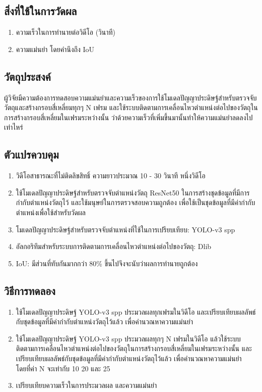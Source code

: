 \subsection*{สิ่งที่ใช้ในการวัดผล}
	\begin{enumerate}
		\setlength\itemsep{-0.25em}
		\item ความเร็วในการทำนายต่อวิดีโอ (วินาที)
		\item ความแม่นยำ โดยคำนึงถึง IoU
	\end{enumerate}
\subsection*{วัตถุประสงค์}
ผู้วิจัยมีความต้องการทดสอบความแม่นยำและความเร็วของการใช้โมเดลปัญญาประดิษฐ์สำหรับตรวจจับวัตถุและสร้างกรอบสี่เหลี่ยมทุกๆ N เฟรม 
และใช้ระบบติดตามการเคลื่อนไหวตำแหน่งต่อไปของวัตถุในการสร้างกรอบสี่เหลี่ยมในเฟรมระหว่างนั้น ว่าด้วยความเร็วที่เพิ่มขึ้นมานั้นทำให้ความแม่นยำลดลงไปเท่าไหร่
\subsection*{ตัวแปรควบคุม}
	\begin{enumerate}
		\setlength\itemsep{-0.25em}
		\item วิดีโอสาธารณะที่ไม่ติดลิขสิทธิ์ ความยาวประมาณ 10 - 30 วินาที หนึ่งวิดีโอ
		\item ใช้โมเดลปัญญาประดิษฐ์สำหรับตรวจจับตำแหน่งวัตถุ ResNet50 ในการสร้างชุดข้อมูลที่มีการกำกับตำแหน่งวัตถุไว้ และใช้มนุษย์ในการตรวจสอบความถูกต้อง
		เพื่อใช้เป็นชุดข้อมูลที่มีค่ากำกับตำแหน่งเพื่อใช้สำหรับวัดผล
		\item โมเดลปัญญาประดิษฐ์สำหรับตรวจจับตำแหน่งที่ใช้ในการเปรียบเทียบ: YOLO-v3 spp
		\item อัลกอริทึมสำหรับระบบการติดตามการเคลื่อนไหวตำแหน่งต่อไปของวัตถุ: Dlib
		\item IoU: มีส่วนที่ทับกันมากกว่า 80\% ขึ้นไปจึงจะนับว่าผลการทำนายถูกต้อง
	\end{enumerate}
\subsection*{วิธีการทดลอง}
	\begin{enumerate}
		\setlength\itemsep{-0.25em}
		\item ใช้โมเดลปัญญาประดิษฐ์ YOLO-v3 spp ประมวลผลทุกเฟรมในวิดีโอ และเปรียบเทียบผลลัพธ์กับชุดข้อมูลที่มีค่ากำกับตำแหน่งวัตถุไว้แล้ว เพื่อคำนวณหาความแม่นยำ
		\item ใช้โมเดลปัญญาประดิษฐ์ YOLO-v3 spp ประมวลผลทุกๆ N เฟรมในวิดีโอ แล้วใช้ระบบติดตามการเคลื่อนไหวตำแหน่งต่อไปของวัตถุในการสร้างกรอบสี่เหลี่ยมในเฟรมระหว่างนั้น 
		และเปรียบเทียบผลลัพธ์กับชุดข้อมูลที่มีค่ากำกับตำแหน่งวัตถุไว้แล้ว เพื่อคำนวณหาความแม่นยำ โดยที่ค่า N จะเท่ากับ 10 20 และ 25
		\item เปรียบเทียบความเร็วในการประมวลผล และความแม่นยำ
\end{enumerate}